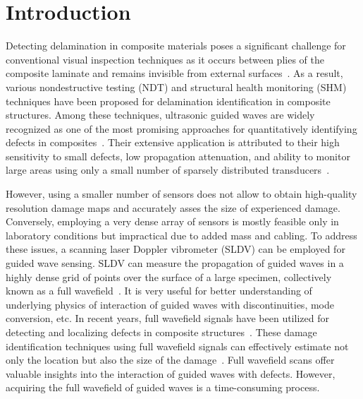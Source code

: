 \section{Introduction}

Detecting delamination in composite materials poses a significant challenge for conventional visual inspection techniques as it occurs between plies of the composite laminate and remains invisible from external surfaces~\cite{staszewski2009health, tuo2019damage}. 
As a result, various nondestructive testing (NDT) and structural health 
monitoring (SHM) techniques have been proposed for delamination identification 
in composite structures. 
Among these techniques, ultrasonic guided waves are widely recognized as one of 
the most promising approaches for quantitatively identifying defects in 
composites~\cite{tian2015delamination, munian2018lamb}. 
Their extensive application is attributed to their high sensitivity to small defects, low propagation attenuation, and ability to monitor large areas using only a small number of sparsely distributed transducers~\cite{Barthorpe2020, Ihn2008, Cantero-Chinchilla2020}.

However, using a smaller number of sensors does not allow to obtain 
high-quality resolution damage maps and accurately asses the size of 
experienced damage. 
Conversely, employing a very dense array of sensors is mostly feasible only in laboratory conditions but impractical due to added mass and cabling. To address these issues, a scanning laser Doppler vibrometer (SLDV) can be employed for guided wave sensing. 
SLDV can measure the propagation of guided waves in a highly dense grid of points over the surface of a large specimen, collectively known as a full wavefield~\cite{Radzienski2019a}. 
It is very useful for better understanding of underlying physics of interaction of guided waves with discontinuities, mode conversion, etc.
In recent years, full wavefield signals have been utilized for detecting and localizing defects in composite structures~\cite{Radzienski2019a, Girolamo2018a, kudela2018impact, rogge2013characterization}. 
These damage identification techniques using full wavefield signals can effectively estimate not only the location but also the size of the damage~\cite{Girolamo2018a, kudela2018impact}. 
Full wavefield scans offer valuable insights into the interaction of guided waves with defects. However, acquiring the full wavefield of guided waves is a time-consuming process.

